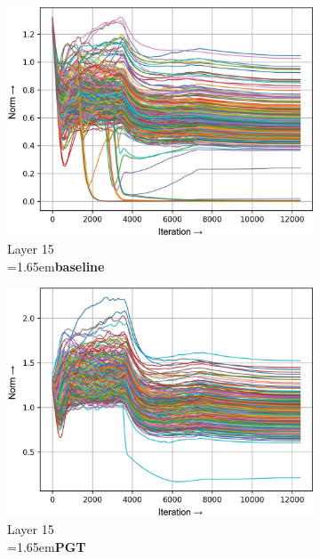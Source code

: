 \documentclass[runningheads]{llncs}
\newcommand{\forceindentb}{\parindent=1.65em\indent\parindent=0pt\relax}
\begin{document}
\begin{figure}[t]
\captionsetup{font=footnotesize}
\begin{subfigure}[t]{0.16\textwidth}
\includegraphics[width=\textwidth]{trimmed/baseline-w-layer-5-3}
\caption{Layer 15\\ \forceindentb\textbf{baseline}}
\end{subfigure}
\begin{subfigure}[t]{0.16\textwidth}
\includegraphics[width=\textwidth]{trimmed/pgt-w-layer-5-3}
\caption{Layer 15\\ \forceindentb\textbf{PGT}}
\end{subfigure}
\begin{subfigure}[t]{0.16\textwidth}

\end{subfigure}
\end{figure}
\end{document}

